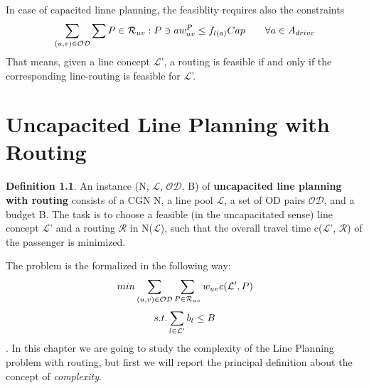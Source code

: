 \documentclass[
  twoside,
  11pt, a4paper,
  footinclude=true,
  headinclude=true,
  cleardoublepage=empty
]{book}
\theoremstyle{definition}
\newtheorem{definition}[theorem]{Definition}
\begin{document}
In case of capacited linne planning, the feasiblity requires also the constraints
\begin{equation} \notag
\sum_{(u,v)\in\mathcal{OD}} \sum{P\in\mathcal{R}_{uv}:P\ni a} w^{P}_{uv} \le f_{l(a)}Cap \quad \quad \forall a \in A_{drive}
\end{equation}
That means, given a line concept $\mathcal{L}$', a routing is feasible if and only if the corresponding line-routing is feasible for $\mathcal{L}$'.



\chapter{Uncapacited Line Planning with Routing}
\begin{definition} An instance (N, $\mathcal{L}$, $\mathcal{OD}$, B) of \textbf{uncapacited line planning with routing} consists of a CGN N, a line pool $\mathcal{L}$, a set of OD pairs $\mathcal{OD}$, and a budget B. \newline
The task is to choose a feasible (in the uncapacitated sense) line concept $\mathcal{L}$' and a routing $\mathcal{R}$ in N($\mathcal{L}$), such that the overall travel time c($\mathcal{L}$', $\mathcal{R}$) of the passenger is minimized.
\end{definition}
The problem is the formalized in the following way:
\begin{equation} \notag
min \sum_{(u, v) \in \mathcal{OD}} \sum_{P \in \mathcal{R}_{uv}} w_{uv}c(\mathcal{L}', P)
\end{equation}
\begin{equation} \notag
s.t. \sum_{l \in \mathcal{L}'} b_l \le B
\end{equation}. 
In this chapter we are going to study the complexity of the Line Planning problem with routing, but first we will report the principal definition about the concept of \emph{complexity}.
\end{document}
